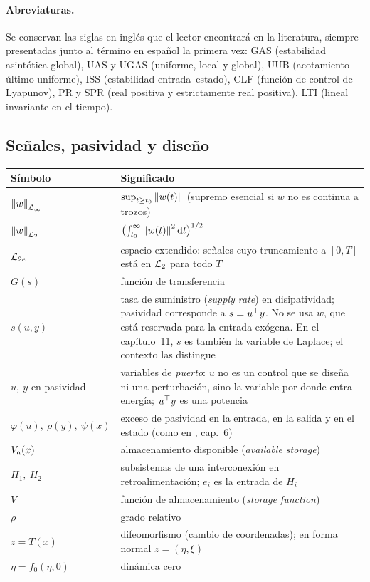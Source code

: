 \paragraph{Abreviaturas.} Se conservan las siglas en inglés que el lector encontrará en la literatura, siempre presentadas junto al término en español la primera vez:
GAS (estabilidad asintótica global), UAS y UGAS (uniforme, local y global), UUB (acotamiento último uniforme), ISS (estabilidad entrada--estado), CLF (función de control de Lyapunov), PR y SPR (real positiva y estrictamente real positiva), LTI (lineal invariante en el tiempo).

\subsection*{Señales, pasividad y diseño}


\small
\begin{tabular}{@{}>{\raggedright\arraybackslash}p{3.0cm}>{\raggedright\arraybackslash}p{9.5cm}@{}}
\toprule
Símbolo & Significado \\
\midrule
$\left\lVert w\right\rVert_{\mathcal{L}_{\infty}}$ & $\sup_{t\ge t_0}\left\lVert w(t)\right\rVert$ (supremo esencial si $w$ no es continua a trozos) \\
$\left\lVert w\right\rVert_{\mathcal{L}_{2}}$ & $\bigl(\int_{t_0}^\infty\left\lVert w(t)\right\rVert^2\mathrm{d} t\bigr)^{1/2}$ \\
$\mathcal{L}_{2e}$ & espacio extendido: señales cuyo truncamiento a $[0,T]$ está en $\mathcal{L}_{2}$ para todo $T$ \\
$G(s)$ & función de transferencia \\
$s(u,y)$ & tasa de suministro (\emph{supply rate}) en disipatividad; pasividad corresponde a $s=u^{\top} y$. No se usa $w$, que está reservada para la entrada exógena. En el capítulo~11, $s$ es también la variable de Laplace; el contexto las distingue \\
$u,\ y$ en pasividad & variables de \emph{puerto}: $u$ no es un control que se diseña ni una perturbación, sino la variable por donde entra energía; $u^{\top} y$ es una potencia \\
$\varphi(u),\ \rho(y),\ \psi(x)$ & exceso de pasividad en la entrada, en la salida y en el estado (como en \citet{Kha02}, cap.~6) \\
$V_a(x)$ & almacenamiento disponible (\emph{available storage}) \\
$H_1,\ H_2$ & subsistemas de una interconexión en retroalimentación; $e_i$ es la entrada de $H_i$ \\
$V$ & función de almacenamiento (\emph{storage function}) \\
$\rho$ & grado relativo \\
$z=T(x)$ & difeomorfismo (cambio de coordenadas); en forma normal $z=(\eta,\xi)$ \\
$\dot\eta=f_0(\eta,0)$ & dinámica cero \\
\bottomrule
\end{tabular}


